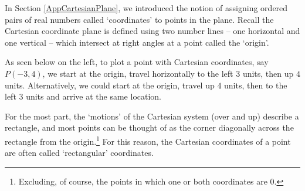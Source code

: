 \documentclass{ximera}
\begin{document}
	\author{Stitz-Zeager}




\setcounter{footnote}{0}

\label{PolarCoordinates}

In Section \ref{AppCartesianPlane}, we introduced the notion of assigning ordered pairs of real numbers called `coordinates'  to points in the plane.  Recall the Cartesian coordinate plane  is defined using two number lines -- one horizontal and one vertical -- which intersect at right angles at a point called the `origin'.   


\smallskip

As seen below on the left, to plot a point with Cartesian coordinates, say $P(-3,4)$, we start at the origin, travel horizontally to the left $3$ units, then up $4$ units. Alternatively, we could start at the origin, travel up $4$ units, then to the left $3$ units and arrive at the same location. 

\smallskip

For the most part, the `motions' of the Cartesian system (over and up) describe a rectangle, and most points can be thought of as the corner diagonally across the rectangle from the origin.\footnote{Excluding, of course, the points in which one or both coordinates are $0$.}  For this reason, the Cartesian coordinates of a point are often called    `rectangular' coordinates.  

\smallskip
\end{document}

